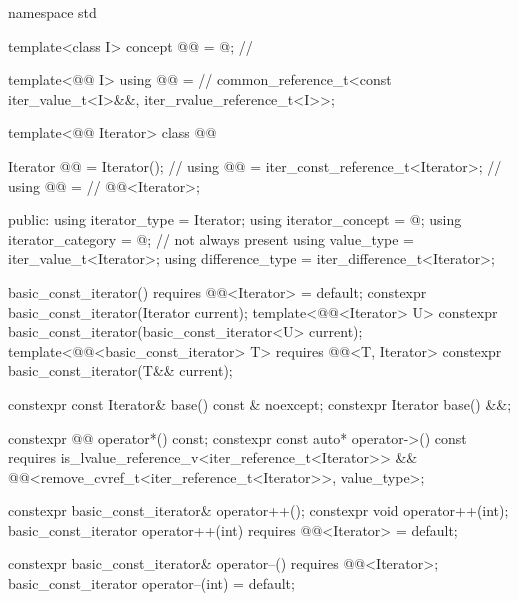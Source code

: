 \begin{codeblock}
namespace std {
  template<class I>
    concept @@ = @\seebelow@;                   // \expos

  template<@@ I>
    using @@ =                       // \expos
      common_reference_t<const iter_value_t<I>&&, iter_rvalue_reference_t<I>>;

  template<@@ Iterator>
  class @@ {
    Iterator @@ = Iterator();                             // \expos
    using @@ = iter_const_reference_t<Iterator>;         // \expos
    using @@ =                                    // \expos
      @@<Iterator>;

  public:
    using iterator_type = Iterator;
    using iterator_concept = @\seebelow@;
    using iterator_category = @\seebelow@;  // not always present
    using value_type = iter_value_t<Iterator>;
    using difference_type = iter_difference_t<Iterator>;

    basic_const_iterator() requires @@<Iterator> = default;
    constexpr basic_const_iterator(Iterator current);
    template<@@<Iterator> U>
      constexpr basic_const_iterator(basic_const_iterator<U> current);
    template<@@<basic_const_iterator> T>
      requires @@<T, Iterator>
      constexpr basic_const_iterator(T&& current);

    constexpr const Iterator& base() const & noexcept;
    constexpr Iterator base() &&;

    constexpr @@ operator*() const;
    constexpr const auto* operator->() const
      requires is_lvalue_reference_v<iter_reference_t<Iterator>> &&
               @@<remove_cvref_t<iter_reference_t<Iterator>>, value_type>;

    constexpr basic_const_iterator& operator++();
    constexpr void operator++(int);
    basic_const_iterator operator++(int) requires @@<Iterator> = default;

    constexpr basic_const_iterator& operator--() requires @@<Iterator>;
    basic_const_iterator operator--(int) = default;

}}
\end{codeblock}
